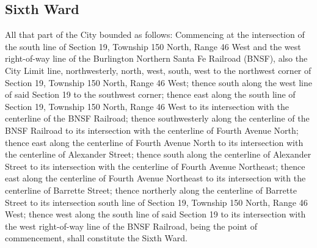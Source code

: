 \subsection{Sixth Ward}
All that part of the City bounded as follows:  Commencing at the intersection of the south line of Section 19, Township 150 North, Range 46 West and the west right-of-way line of the Burlington Northern Santa Fe Railroad (BNSF), also the City Limit line, northwesterly, north, west, south, west to the northwest corner of Section 19, Township 150 North, Range 46 West; thence south along the west line of said Section 19 to the southwest corner; thence east along the south line of Section 19, Township 150 North, Range 46 West to its intersection with the centerline of the BNSF Railroad; thence southwesterly along the centerline of the BNSF Railroad to its intersection with the centerline of Fourth Avenue North; thence east along the centerline of Fourth Avenue North to its intersection with the centerline of Alexander Street; thence south along the centerline of Alexander Street to its intersection with the centerline of Fourth Avenue Northeast; thence east along the centerline of Fourth Avenue Northeast to its intersection with the centerline of Barrette Street; thence northerly along the centerline of Barrette Street to its intersection south line of Section 19, Township 150 North, Range 46 West; thence west along the south line of said Section 19 to its intersection with the west right-of-way line of the BNSF Railroad, being the point of commencement, shall constitute the Sixth Ward.
